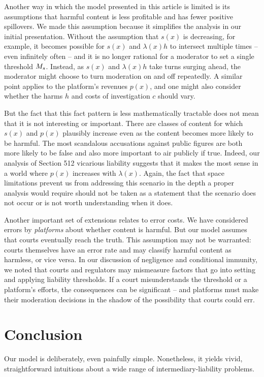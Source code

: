 Another way in which the model presented in this article is limited is its assumptions that harmful content is less profitable and has fewer positive spillovers. We made this assumption because it simplifies the analysis in our initial presentation. Without the assumption that $s(x)$ is decreasing, for example, it becomes possible for $s(x)$ and $\lambda(x)h$ to intersect multiple times -- even infinitely often -- and it is no longer rational for a moderator to set a single threshold $M_s$. Instead, as $s(x)$ and $\lambda(x)h$ take turns surging ahead, the moderator might choose to turn moderation on and off repeatedly. A similar point applies to the platform's revenues $p(x)$, and one might also consider whether the harms $h$ and costs of investigation $c$ should vary.

But the fact that this fact pattern is less mathematically tractable does not mean that it is not interesting or important. There are classes of content for which $s(x)$ and $p(x)$ plausibly increase even as the content becomes more likely to be harmful. The most scandalous accusations against public figures are both more likely to be false and also more important to air publicly if true. Indeed, our analysis of Section 512 vicarious liability suggests that it makes the most sense in a world where $p(x)$ increases with $\lambda(x)$. Again, the fact that space limitations prevent us from addressing this scenario in the depth a proper analysis would require should not be taken as a statement that the scenario does not occur or is not worth understanding when it does.

Another important set of extensions relates to error costs. We have considered errors by \emph{platforms} about whether content is harmful. But our model assumes that courts eventually reach the truth. This assumption may not be warranted: courts themselves have an error rate and may classify harmful content as harmless, or vice versa. In our discussion of negligence and conditional immunity, we noted that courts and regulators may mismeasure factors that go into setting and applying liability thresholds. If a court misunderstands the threshold or a platform's efforts, the consequences can be significant -- and platforms must make their moderation decisions in the shadow of the possibility that courts could err. 

\section{Conclusion}
\label{sec:conclusion}

Our model is deliberately, even painfully simple. Nonetheless, it yields vivid, straightforward intuitions about a wide range of intermediary-liability problems.



